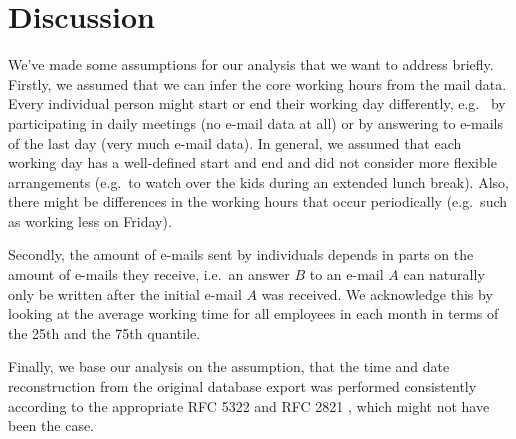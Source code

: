 \documentclass{article}
\begin{document}
\section{Discussion}
We've made some assumptions for our analysis that we want to address briefly.
Firstly, we assumed that we can infer the core working hours from the mail data.
Every individual person might start or end their working day differently, e.g.~
by participating in daily meetings (no e-mail data at all) or by answering to
e-mails of the last day (very much e-mail data). In general, we assumed that
each working day has a well-defined start and end and did not consider more
flexible arrangements (e.g.~to watch over the kids during an extended lunch
break). Also, there might be differences in the working hours that occur
periodically (e.g.~such as working less on Friday).

Secondly, the amount of e-mails sent by individuals depends in parts on the
amount of e-mails they receive, i.e.~an answer $B$ to an e-mail $A$ can naturally
only be written after the initial e-mail $A$ was received. We acknowledge this
by looking at the average working time for all employees in each month in terms
of the 25th and the 75th quantile.

Finally, we base our analysis on the assumption, that the time and date
reconstruction from the original database export was performed consistently
according to the appropriate RFC 5322 \citep{rfc5322} and RFC 2821
\citep{rfc2821}, which might not have been the case.



\end{document}
